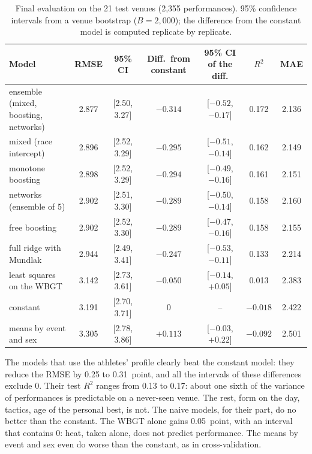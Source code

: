 \documentclass[11pt,a4paper]{article}
\begin{document}
\begin{table}[htbp]
\centering
\small
\caption{Final evaluation on the 21 test venues (2,355 performances). 95\% confidence intervals from a venue bootstrap
($B = 2{,}000$); the difference from the constant model is computed replicate by replicate.}
\label{tab:test}
\begin{tabular}{@{}lcccccc@{}}
\toprule
Model & RMSE & 95\% CI & Diff.\ from constant & 95\% CI of the diff. & $R^2$ & MAE \\
\midrule
ensemble (mixed, boosting, networks) & 2.877 & [2.50, 3.27] & $-0.314$ & [$-0.52$, $-0.17$] & 0.172 & 2.136 \\
mixed (race intercept) & 2.896 & [2.52, 3.29] & $-0.295$ & [$-0.51$, $-0.14$] & 0.162 & 2.149 \\
monotone boosting & 2.898 & [2.52, 3.29] & $-0.294$ & [$-0.49$, $-0.16$] & 0.161 & 2.151 \\
networks (ensemble of 5) & 2.902 & [2.51, 3.30] & $-0.289$ & [$-0.50$, $-0.14$] & 0.158 & 2.160 \\
free boosting & 2.902 & [2.52, 3.30] & $-0.289$ & [$-0.47$, $-0.16$] & 0.158 & 2.155 \\
full ridge with Mundlak & 2.944 & [2.49, 3.41] & $-0.247$ & [$-0.53$, $-0.11$] & 0.133 & 2.214 \\
least squares on the WBGT & 3.142 & [2.73, 3.61] & $-0.050$ & [$-0.14$, $+0.05$] & 0.013 & 2.383 \\
constant & 3.191 & [2.70, 3.71] & 0 & -- & $-0.018$ & 2.422 \\
means by event and sex & 3.305 & [2.78, 3.86] & $+0.113$ & [$-0.03$, $+0.22$] & $-0.092$ & 2.501 \\
\bottomrule
\end{tabular}
\end{table}

The models that use the athletes' profile clearly beat the constant model: they reduce the RMSE by 0.25 to
0.31~point, and all the intervals of these differences exclude 0. Their test $R^2$ ranges from 0.13 to 0.17: about one
sixth of the variance of performances is predictable on a never-seen venue. The rest, form on the day, tactics, age of
the personal best, is not. The naive models, for their part, do no better than the constant. The WBGT alone gains
0.05~point, with an interval that contains 0: heat, taken alone, does not predict performance. The means by event and
sex even do worse than the constant, as in cross-validation.
\end{document}
